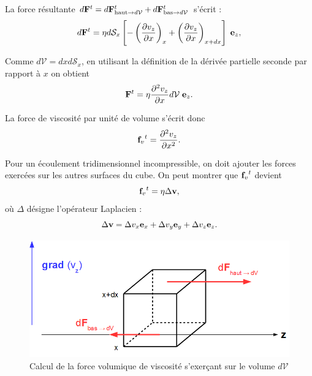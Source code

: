 \documentclass[11pt,a4paper]{report}
\begin{document}
La force résultante $d\bold{F}^t = d\bold{F}_{\text{haut}\rightarrow d\mathcal{V}}^t + d\bold{F}_{\text{bas}\rightarrow d\mathcal{V}}^t$ s'écrit :
\begin{equation}
	d\bold{F}^t = \eta d\mathcal{S}_x \left[ -\left(\frac{\partial v_z}{\partial x}\right)_{x}
	+ \left(\frac{\partial v_z}{\partial x}\right)_{x+dx}  \right]\;\bold{e}_z,
\end{equation}

Comme $d\mathcal{V} = dx d\mathcal{S}_x$, en utilisant la définition de la dérivée partielle seconde par rapport à $x$ on obtient
\begin{equation}
	\bold{F}^t = \eta \frac{\partial^2 v_z}{\partial x} d\mathcal{V}\;\bold{e}_z.
\end{equation}

La force de viscosité par unité de volume s'écrit donc
\begin{equation}
	{\bold{f}_v}^t = \frac{\partial^2 v_z}{\partial x^2}.
\end{equation} 

Pour un écoulement tridimensionnel incompressible, on doit ajouter les forces exercées sur les autres surfaces du cube. On peut montrer que ${\bold{f}_v}^t$ devient 
\begin{equation}
	{\bold{f}_v}^t = \eta\Delta \bold{v},
\end{equation}
où $\Delta$ désigne l'opérateur Laplacien :
\begin{equation}
	\Delta\bold{v} = \Delta v_x \bold{e}_x + \Delta v_y \bold{e}_y + \Delta v_z \bold{e}_z.
\end{equation}

\begin{figure}[h!]
\begin{center}
	\includegraphics[scale = 0.5]{visco_vol.png}
	\caption{Calcul de la force volumique de viscosité s'exerçant sur le volume $d\mathcal{V}$} 
	\label{fig:visco_vol}
\end{center}
\end{figure}
\end{document}
